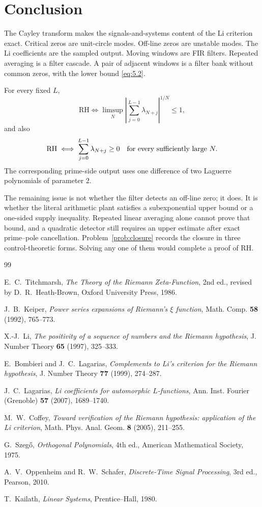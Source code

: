 \documentclass[11pt]{amsart}
\numberwithin{equation}{section}
\theoremstyle{definition}
\theoremstyle{remark}
\newcommand{\RH}{\mathrm{RH}}
\begin{document}
\section{Conclusion}

The Cayley transform makes the signals-and-systems content of the Li
criterion exact. Critical zeros are unit-circle modes. Off-line zeros are
unstable modes. The Li coefficients are the sampled output. Moving windows
are FIR filters. Repeated averaging is a filter cascade. A pair of adjacent
windows is a filter bank without common zeros, with the lower bound
\eqref{eq:5.2}.

For every fixed \(L\),
\[
 \RH\iff
 \limsup_N\left|\sum_{j=0}^{L-1}\lambda_{N+j}\right|^{1/N}
 \le1,
\]
and also
\[
 \RH\iff
 \sum_{j=0}^{L-1}\lambda_{N+j}\ge0
 \quad\hbox{for every sufficiently large }N.
\]
The corresponding prime-side output uses one difference of two Laguerre
polynomials of parameter \(2\).

The remaining issue is not whether the filter detects an off-line zero; it
does. It is whether the literal arithmetic plant satisfies a subexponential
upper bound or a one-sided supply inequality. Repeated linear averaging
alone cannot prove that bound, and a quadratic detector still requires an
upper estimate after exact prime--pole cancellation.
Problem~\ref{prob:closure} records the closure in three control-theoretic
forms. Solving any one of them would complete a proof of RH.

\begin{thebibliography}{99}

E.~C.~Titchmarsh,
\emph{The Theory of the Riemann Zeta-Function}, 2nd ed.,
revised by D.~R.~Heath-Brown, Oxford University Press, 1986.

J.~B.~Keiper,
\emph{Power series expansions of Riemann's \(\xi\) function},
Math. Comp. \textbf{58} (1992), 765--773.

X.-J.~Li,
\emph{The positivity of a sequence of numbers and the Riemann hypothesis},
J. Number Theory \textbf{65} (1997), 325--333.

E.~Bombieri and J.~C.~Lagarias,
\emph{Complements to Li's criterion for the Riemann hypothesis},
J. Number Theory \textbf{77} (1999), 274--287.

J.~C.~Lagarias,
\emph{Li coefficients for automorphic \(L\)-functions},
Ann. Inst. Fourier (Grenoble) \textbf{57} (2007), 1689--1740.

M.~W.~Coffey,
\emph{Toward verification of the Riemann hypothesis: application of the
Li criterion},
Math. Phys. Anal. Geom. \textbf{8} (2005), 211--255.

G.~Szeg\H{o},
\emph{Orthogonal Polynomials}, 4th ed.,
American Mathematical Society, 1975.

A.~V.~Oppenheim and R.~W.~Schafer,
\emph{Discrete-Time Signal Processing}, 3rd ed.,
Pearson, 2010.

T.~Kailath,
\emph{Linear Systems},
Prentice--Hall, 1980.

\end{thebibliography}
\end{document}
